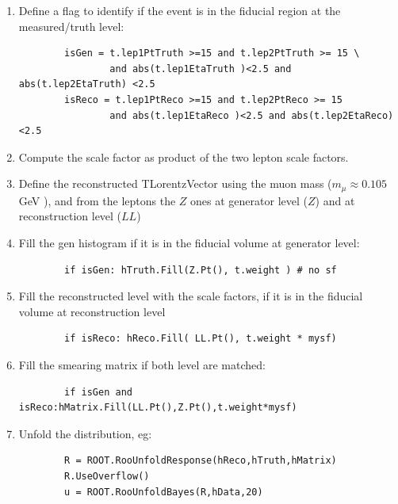 \documentclass[a4paper,11pt]{article}
\begin{document}
\begin{enumerate}
\item  Define a flag to identify if the event is in the fiducial region at the measured/truth level:
\begin{verbatim}
        isGen = t.lep1PtTruth >=15 and t.lep2PtTruth >= 15 \  
                and abs(t.lep1EtaTruth )<2.5 and abs(t.lep2EtaTruth) <2.5
        isReco = t.lep1PtReco >=15 and t.lep2PtReco >= 15  
                and abs(t.lep1EtaReco )<2.5 and abs(t.lep2EtaReco) <2.5
\end{verbatim}

\item Compute the scale factor as product of the two lepton scale factors.

\item Define the reconstructed TLorentzVector using the muon mass ($m_\mu \approx 0.105$ GeV ), and from the leptons the $Z$ ones at generator level ($Z$) and at reconstruction level ($LL$)

\item Fill the gen histogram if it is in the fiducial volume at generator level:
\begin{verbatim}
        if isGen: hTruth.Fill(Z.Pt(), t.weight ) # no sf
\end{verbatim}

\item Fill the reconstructed level with the scale factors, if it is in the fiducial volume at reconstruction level
\begin{verbatim}
        if isReco: hReco.Fill( LL.Pt(), t.weight * mysf)
\end{verbatim}

\item Fill the smearing matrix if both level are matched:
\begin{verbatim}
        if isGen and isReco:hMatrix.Fill(LL.Pt(),Z.Pt(),t.weight*mysf)
\end{verbatim}

\item Unfold the distribution, eg:
\begin{verbatim}
        R = ROOT.RooUnfoldResponse(hReco,hTruth,hMatrix)
        R.UseOverflow()
        u = ROOT.RooUnfoldBayes(R,hData,20)
\end{verbatim}
\end{enumerate}
\end{document}
